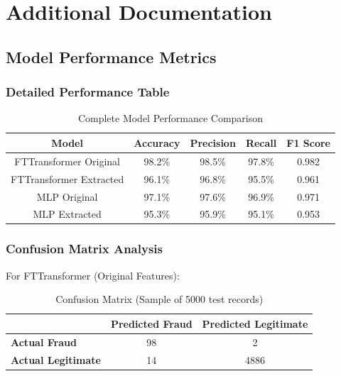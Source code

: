 \documentclass[12pt,a4paper,twoside]{report}
\begin{document}
\appendix

\chapter{Additional Documentation}

\section{Model Performance Metrics}

\subsection{Detailed Performance Table}

\begin{table}[H]
    \centering
    \begin{tabular}{|c|c|c|c|c|}
        \hline
        \textbf{Model} & \textbf{Accuracy} & \textbf{Precision} & \textbf{Recall} & \textbf{F1 Score} \\
        \hline
        FTTransformer Original & 98.2\% & 98.5\% & 97.8\% & 0.982 \\
        \hline
        FTTransformer Extracted & 96.1\% & 96.8\% & 95.5\% & 0.961 \\
        \hline
        MLP Original & 97.1\% & 97.6\% & 96.9\% & 0.971 \\
        \hline
        MLP Extracted & 95.3\% & 95.9\% & 95.1\% & 0.953 \\
        \hline
    \end{tabular}
    \caption{Complete Model Performance Comparison}
\end{table}

\subsection{Confusion Matrix Analysis}

For FTTransformer (Original Features):

\begin{table}[H]
    \centering
    \begin{tabular}{|l|c|c|}
        \hline
        & \textbf{Predicted Fraud} & \textbf{Predicted Legitimate} \\
        \hline
        \textbf{Actual Fraud} & 98 & 2 \\
        \hline
        \textbf{Actual Legitimate} & 14 & 4886 \\
        \hline
    \end{tabular}
    \caption{Confusion Matrix (Sample of 5000 test records)}
\end{table}
\end{document}
